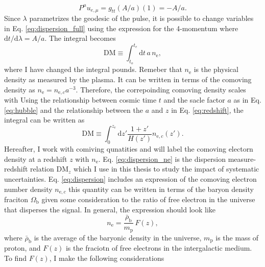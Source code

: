\begin{equation}
    P^\mu u_{e,\mu} = g_{tt}(A/a)(1)  = -A/a.
\end{equation}
Since $\lambda$ parametrizes the geodesic of the pulse, it is possible to change variables in Eq. \ref{eq:dispersion_full} using the expression for the 4-momentum where $\mathrm{d}t/\mathrm{d}\lambda = A/a$. The integral becomes
\begin{equation}
    \mathrm{DM} \equiv \int_{t_o}^{t_e} \mathrm{d}t \, a \, n_\mathrm{e},
\end{equation}
where I have changed the integral pounds. Remeber that $n_\mathrm{e}$ is the physical density as measured by the plasma. It can be written in terms of the comoving density as $n_\mathrm{e} = n_{\mathrm{e}, c} a^{-3}$. Therefore, the correpoinding comoving density scales with Using the relationship between cosmic time $t$ and the sacle factor $a$ as in Eq. \ref{eq:hubble} and the relationship between the $a$ and $z$ in Eq. \ref{eq:redshift}, the integral can be written as
\begin{equation} \label{eq:dispersion_ne}
    \mathrm{DM} \equiv \int^{z_e}_{0} \mathrm{d}z' \frac{1 + z'}{H(z')}  n_{\mathrm{e}, c}(z').
\end{equation}
Hereafter, I work with comiving qunatities and will label the comoving electorn density at a redshift $z$ with $n_\mathrm{e}$. Eq. \ref{eq:dispersion_ne} is the dispersion measure-redshift relation $\mathrm{DM}_z$ which I use in this thesis to study the impact of systematic uncertainties. Eq. \ref{eq:dispersion} includes an expression of the comoving electron number density $n_{\mathrm{e}, c}$ this quantity can be written in terms of the baryon density fraciton $\Omega_\mathrm{b}$ given some consideration to the ratio of free electron in the universe that disperses the signal. In general, the expression should look like
\begin{equation}
    n_{\mathrm{e}} = \frac{\bar{\rho}_\mathrm{b}}{m_\mathrm{p}}\, F(z),
\end{equation}
where $\bar{\rho}_\mathrm{b}$ is the average of the baryonic density in the universe, $m_\mathrm{p}$ is the mass of proton, and $F(z)$ is the fraciotn of free electrons in the intergalactic medium. To find $F(z)$, I make the following considerations
